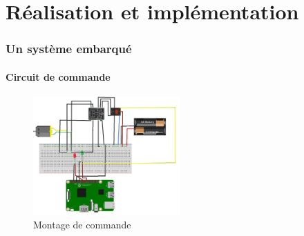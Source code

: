 \section{Réalisation et implémentation}


\begin{frame}
\frametitle{Un système embarqué}
\framesubtitle{Circuit de commande}

\begin{figure}
    \centering
    \includegraphics[width=0.5\textwidth]{figures/Montage1.jpg}\caption{Montage de commande}
\end{figure}

\end{frame}


